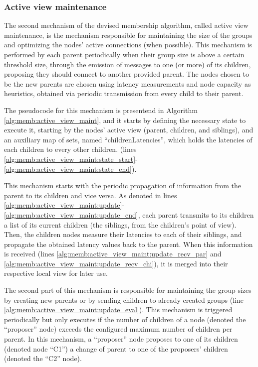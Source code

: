 \subsubsection{Active view maintenance} \label{sec:overlay_network:active_view_maint}

The second mechanism of the devised membership algorithm, called active view maintenance, is the mechanism responsible for maintaining the size of the groups and optimizing the nodes' active connections (when possible). This mechanism is performed by each parent periodically when their group size is above a certain threshold size, through the emission of messages to one (or more) of its children, proposing they should connect to another provided parent. The nodes chosen to be the new parents are chosen using latency measurements and node capacity as heuristics, obtained via periodic transmission from every child to their parent. 

The pseudocode for this mechanism is presentend in Algorithm \ref{alg:memb:active_view_maint}, and it starts by defining the necessary state to execute it, starting by the nodes' active view (parent, children, and siblings), and an auxiliary map of sets, named ``childrenLatencies'', which holds the latencies of each children to every other children. (lines \ref{alg:memb:active_view_maint:state_start}-\ref{alg:memb:active_view_maint:state_end}). 



This mechanism starts with the periodic propagation of information from the parent to its children and vice versa. As denoted in lines \ref{alg:memb:active_view_maint:update}-\ref{alg:memb:active_view_maint:update_end}, each parent transmits to its children a list of its current children (the siblings, from the children's point of view). Then, the children nodes measure their latencies to each of their siblings, and propagate the obtained latency values back to the parent. When this information is received (lines \ref{alg:memb:active_view_maint:update_recv_par} and \ref{alg:memb:active_view_maint:update_recv_chi}), it is merged into their respective local view for later use.

The second part of this mechanism is responsible for maintaining the group sizes by creating new parents or by sending children to already created groups (line \ref{alg:memb:active_view_maint:update_eval}). This mechanism is triggered periodically but only executes if the number of children of a  node (denoted the ``proposer'' node) exceeds the configured maximum number of children per parent. In this mechanism, a ``proposer'' node proposes to one of its children (denoted node ``C1'') a change of parent to one of the proposers' children (denoted the ``C2'' node).


